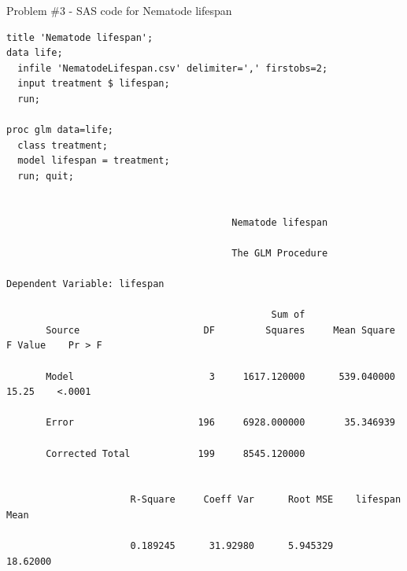 \documentclass[10pt,draft]{article}
\begin{document}
\newpage
Problem \#3 - SAS code for Nematode lifespan
\begin{verbatim}
title 'Nematode lifespan';
data life;
  infile 'NematodeLifespan.csv' delimiter=',' firstobs=2;
  input treatment $ lifespan;
  run;

proc glm data=life;
  class treatment;
  model lifespan = treatment;
  run; quit;


                                        Nematode lifespan    

                                        The GLM Procedure

Dependent Variable: lifespan

                                               Sum of
       Source                      DF         Squares     Mean Square    F Value    Pr > F

       Model                        3     1617.120000      539.040000      15.25    <.0001

       Error                      196     6928.000000       35.346939

       Corrected Total            199     8545.120000


                      R-Square     Coeff Var      Root MSE    lifespan Mean

                      0.189245      31.92980      5.945329         18.62000
 \end{verbatim}
\end{document}
